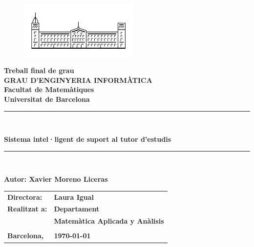 \documentclass[12pt,a4paper,catalan]{article}
\newcommand{\titleTFG}{Sistema intel·ligent de suport al tutor d'estudis}
\newcommand{\myname}{Xavier Moreno Liceras}
\begin{document}
\thispagestyle{empty}

\begin{titlepage}
\begin{center}
\begin{figure}[h]
\begin{center}
\includegraphics[width=6cm]{img/ub.png}
\end{center}
\end{figure}

\textbf{\LARGE Treball final de grau} \\
\vspace*{.5cm}
\textbf{\LARGE GRAU D'ENGINYERIA INFORMÀTICA } \\
\vspace*{.5cm}
\textbf{\LARGE Facultat de Matemàtiques \\ Universitat de Barcelona} \\
\vspace*{1.5cm}
\rule{\textwidth}{0.1mm}\\
\begin{Huge}
\textbf{\titleTFG} \\
\end{Huge}
\rule{\textwidth}{0.1mm}\\

\vspace{1cm}

\begin{flushright}
\textbf{\LARGE Autor: \myname}

\vspace*{2cm}

\renewcommand{\arraystretch}{1.5}
\begin{tabular}{ll}
\textbf{\Large Directora:} & \textbf{\Large Laura Igual } \\
\textbf{\Large Realitzat a:} & \textbf{\Large  Departament   } \\
 & \textbf{\Large Matemàtica Aplicada y Anàlisis} \\
\\
\textbf{\Large Barcelona,} & \textbf{\Large \today }
\end{tabular}

\end{flushright}

\end{center}
\end{titlepage}
\end{document}
